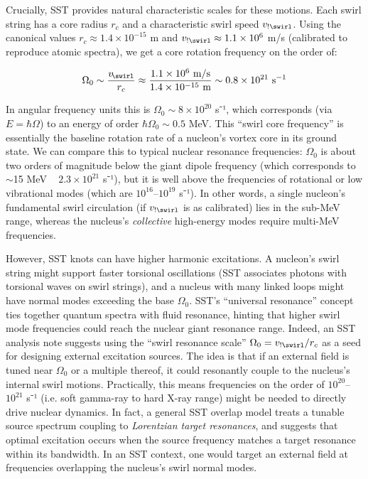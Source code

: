 \documentclass[11pt]{article}
\begin{document}
Crucially, SST provides natural characteristic scales for these motions. Each swirl string has a core radius $r_c$ and a characteristic swirl speed $v_{!\swirl}$. Using the canonical values $r_c\approx1.4\times10^{-15}$ m and $v_{!\swirl}\approx1.1\times10^6$ m/s (calibrated to reproduce atomic spectra), we get a core rotation frequency on the order of:


\[
\Omega_0 \sim \frac{v_{\!\swirl}}{r_c} \approx \frac{1.1\times10^6~\text{m/s}}{1.4\times10^{-15}~\text{m}} \sim 0.8\times10^{21}~\text{s}^{-1}
\]


In angular frequency units this is $\Omega_0\sim8\times10^{20}$ s⁻¹, which corresponds (via $E=\hbar\Omega$) to an energy of order $\hbar\Omega_0 \sim 0.5$ MeV. This “swirl core frequency” is essentially the baseline rotation rate of a nucleon’s vortex core in its ground state. We can compare this to typical nuclear resonance frequencies: $\Omega_0$ is about two orders of magnitude below the giant dipole frequency (which corresponds to $\sim$15 MeV ~ $2.3\times10^{21}$ s⁻¹), but it is well above the frequencies of rotational or low vibrational modes (which are $10^{16}$–$10^{19}$ s⁻¹). In other words, a single nucleon’s fundamental swirl circulation (if $v_{!\swirl}$ is as calibrated) lies in the sub-MeV range, whereas the nucleus’s \textit{collective} high-energy modes require multi-MeV frequencies.


However, SST knots can have higher harmonic excitations. A nucleon’s swirl string might support faster torsional oscillations (SST associates photons with torsional waves on swirl strings), and a nucleus with many linked loops might have normal modes exceeding the base $\Omega_0$. SST’s “universal resonance” concept ties together quantum spectra with fluid resonance, hinting that higher swirl mode frequencies could reach the nuclear giant resonance range. Indeed, an SST analysis note suggests using the “swirl resonance scale” $\Omega_0 = v_{!\swirl}/r_c$ as a seed for designing external excitation sources. The idea is that if an external field is tuned near $\Omega_0$ or a multiple thereof, it could resonantly couple to the nucleus’s internal swirl motions. Practically, this means frequencies on the order of $10^{20}$–$10^{21}$ s⁻¹ (i.e. soft gamma-ray to hard X-ray range) might be needed to directly drive nuclear dynamics. In fact, a general SST overlap model treats a tunable source spectrum coupling to \textit{Lorentzian target resonances}, and suggests that optimal excitation occurs when the source frequency matches a target resonance within its bandwidth. In an SST context, one would target an external field at frequencies overlapping the nucleus’s swirl normal modes.
\end{document}

